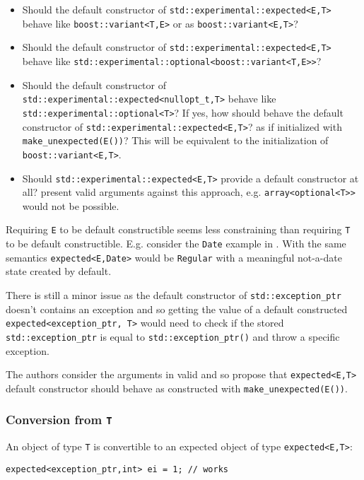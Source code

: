 \documentclass[a4paper,10pt]{article}
\newcommand{\cpp}[1]{\lstinline{#1}}
\begin{document}
\begin{itemize}
\item Should the default constructor of \cpp{std::experimental::expected<E,T>} behave like \cpp{boost::variant<T,E>} or as \cpp{boost::variant<E,T>}?
\item Should the default constructor of \cpp{std::experimental::expected<E,T>} behave like \cpp{std::experimental::optional<boost::variant<T,E>>}?
\item Should the default constructor of \cpp{std::experimental::expected<nullopt_t,T>} behave like \cpp{std::experimental::optional<T>}? If yes, how should behave the default constructor of \cpp{std::experimental::expected<E,T>}? as if initialized with \cpp{make_unexpected(E())}? This will be equivalent to the initialization of \cpp{boost::variant<E,T>}.
\item Should \cpp{std::experimental::expected<E,T>} provide a default constructor at all? \cite{OptionalRev3} present valid arguments against this approach, e.g. \cpp{array<optional<T>>} would not be possible. 
\end{itemize}

Requiring \cpp{E} to be default constructible seems less constraining than requiring \cpp{T} to be default constructible. E.g. consider the \cpp{Date} example in \cite{OptionalRev3}. With the same semantics \cpp{expected<E,Date>} would be \cpp{Regular} with a meaningful not-a-date state created by default.

There is still a minor issue as the default constructor of \cpp{std::exception_ptr} doesn't contains an exception and so getting the value of a default constructed \cpp{expected<exception_ptr, T>} would need to check if the stored \cpp{std::exception_ptr} is equal to \cpp{std::exception_ptr()} and throw a specific exception.

The authors consider the arguments in  \cite{OptionalRev3} valid and so propose that \cpp{expected<E,T>} default constructor should behave as constructed with \cpp{make_unexpected(E())}.

\subsubsection{Conversion from \cpp{T}}

An object of type \cpp{T} is convertible to an expected object of type \cpp{expected<E,T>}:

\begin{lstlisting}
expected<exception_ptr,int> ei = 1; // works
\end{lstlisting}
\end{document}
